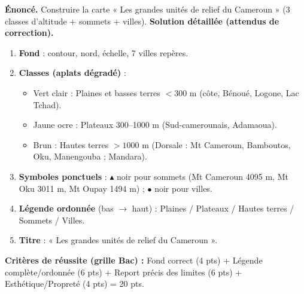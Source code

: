 \documentclass[11pt]{article}
\begin{document}
\begin{exoresolu}
\textbf{Énoncé.} Construire la carte « Les grandes unités de relief du Cameroun » (3 classes d'altitude + sommets + villes).
\tcblower
\textbf{Solution détaillée (attendus de correction).}
\begin{enumerate}
\item \textbf{Fond} : contour, nord, échelle, 7 villes repères.
\item \textbf{Classes (aplats dégradé)} :
\begin{itemize}
\item Vert clair : Plaines et basses terres $< 300$ m (côte, Bénoué, Logone, Lac Tchad).
\item Jaune ocre : Plateaux $300$--\num{1000} m (Sud-camerounais, Adamaoua).
\item Brun : Hautes terres $> \num{1000}$ m (Dorsale : Mt Cameroun, Bamboutos, Oku, Manengouba ; Mandara).
\end{itemize}
\item \textbf{Symboles ponctuels} : $\blacktriangle$ noir pour sommets (Mt Cameroun \num{4095} m, Mt Oku \num{3011} m, Mt Oupay \num{1494} m) ; $\bullet$ noir pour villes.
\item \textbf{Légende ordonnée} (bas $\to$ haut) : Plaines / Plateaux / Hautes terres / Sommets / Villes.
\item \textbf{Titre} : « Les grandes unités de relief du Cameroun ».
\end{enumerate}
\textbf{Critères de réussite (grille Bac) :} Fond correct (4 pts) + Légende complète/ordonnée (6 pts) + Report précis des limites (6 pts) + Esthétique/Propreté (4 pts) = 20 pts.
\end{exoresolu}
\end{document}
